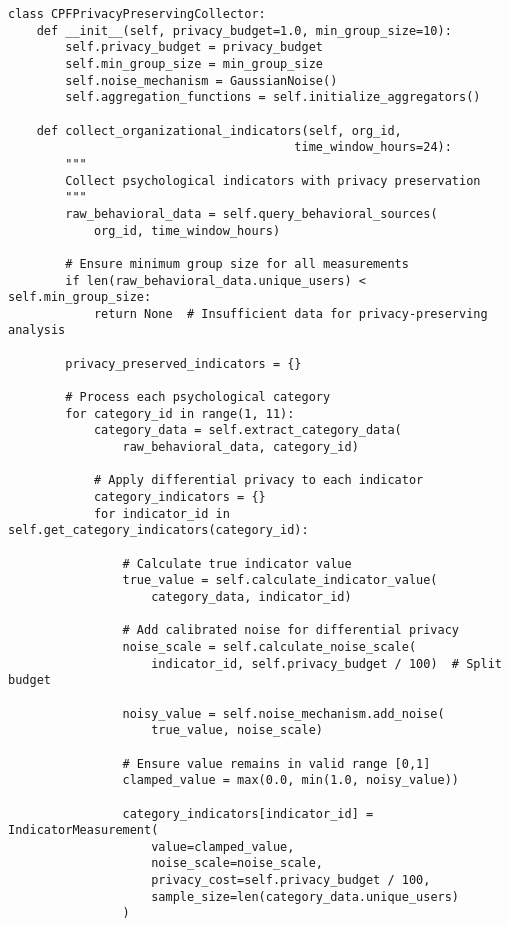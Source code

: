 \documentclass[10pt,twocolumn]{IEEEtran}
\begin{document}
\begin{lstlisting}[caption={Privacy-Preserving Data Collection Architecture}]
class CPFPrivacyPreservingCollector:
    def __init__(self, privacy_budget=1.0, min_group_size=10):
        self.privacy_budget = privacy_budget
        self.min_group_size = min_group_size
        self.noise_mechanism = GaussianNoise()
        self.aggregation_functions = self.initialize_aggregators()
        
    def collect_organizational_indicators(self, org_id, 
                                        time_window_hours=24):
        """
        Collect psychological indicators with privacy preservation
        """
        raw_behavioral_data = self.query_behavioral_sources(
            org_id, time_window_hours)
        
        # Ensure minimum group size for all measurements
        if len(raw_behavioral_data.unique_users) < self.min_group_size:
            return None  # Insufficient data for privacy-preserving analysis
        
        privacy_preserved_indicators = {}
        
        # Process each psychological category
        for category_id in range(1, 11):
            category_data = self.extract_category_data(
                raw_behavioral_data, category_id)
            
            # Apply differential privacy to each indicator
            category_indicators = {}
            for indicator_id in self.get_category_indicators(category_id):
                
                # Calculate true indicator value
                true_value = self.calculate_indicator_value(
                    category_data, indicator_id)
                
                # Add calibrated noise for differential privacy
                noise_scale = self.calculate_noise_scale(
                    indicator_id, self.privacy_budget / 100)  # Split budget
                
                noisy_value = self.noise_mechanism.add_noise(
                    true_value, noise_scale)
                
                # Ensure value remains in valid range [0,1]
                clamped_value = max(0.0, min(1.0, noisy_value))
                
                category_indicators[indicator_id] = IndicatorMeasurement(
                    value=clamped_value,
                    noise_scale=noise_scale,
                    privacy_cost=self.privacy_budget / 100,
                    sample_size=len(category_data.unique_users)
                )
            

\end{lstlisting}
\end{document}
